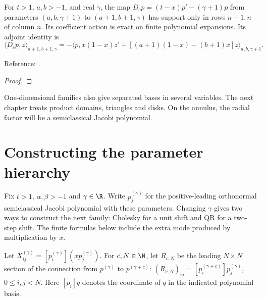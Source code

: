 \begin{supporting}
\begin{theorem}
\label{thm:semiclassical-partial-weighted-differentiation}
\leanok
For $t>1$, $a,b>-1$, and real $\gamma$, the map
$D_c p=(t-x)p'-(\gamma+1)p$ from parameters $(a,b,\gamma+1)$ to
$(a+1,b+1,\gamma)$ has support only in rows $n-1,n$ of column $n$.
Its coefficient action is exact on finite polynomial expansions. Its adjoint identity is
\[
 \langle D_cp,z\rangle_{a+1,b+1,\gamma}
 =-\langle p,x(1-x)z'+[(a+1)(1-x)-(b+1)x]z\rangle_{a,b,\gamma+1}.
\]

Reference: \cite[Section 3.4]{pgso}.
\end{theorem}
\begin{proof}
\leanok
\end{proof}
\end{supporting}


One-dimensional families also give separated bases in several variables.
The next chapter treats product domains, triangles and disks. On the annulus,
the radial factor will be a semiclassical Jacobi polynomial.

\section{Constructing the parameter hierarchy}\label{sec:semiclassical-hierarchy}
Fix $t>1$, $\alpha,\beta>-1$ and $\gamma\in\R$. Write $p_j^{(\gamma)}$ for the
positive-leading orthonormal semiclassical Jacobi polynomial with these parameters.
Changing $\gamma$ gives two ways to construct the next family: Cholesky for a
unit shift and QR for a two-step shift. The finite formulas below include the
extra mode produced by multiplication by $x$.

\begin{definition}
\label{def:semiclassical-hierarchy-matrices}
\leanok
Let $X^{(\gamma)}_{ij}=[p_i^{(\gamma)}](x p_j^{(\gamma)})$.
For $c,N\in\N$, let $R_{c,N}$ be the leading $N\times N$ section of the
connection from $p^{(\gamma)}$ to $p^{(\gamma+c)}$:
$(R_{c,N})_{ij}=[p_i^{(\gamma+c)}]p_j^{(\gamma)}$, $0\le i,j<N$.
Here $[p_i]q$ denotes the coordinate of $q$ in the indicated polynomial basis.
\end{definition}

